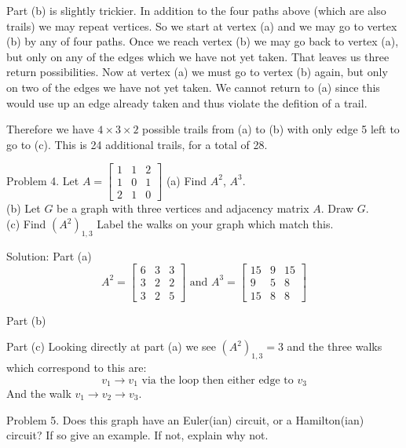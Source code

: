 \documentclass[16 pt]{amsart}
\theoremstyle{definition}
\theoremstyle{remark}
\numberwithin{equation}{subsection}
\begin{document}
Part (b) is slightly trickier.  In addition to the four paths above (which are also trails) we may repeat vertices. So we start at vertex (a) and we may go to vertex (b) by any of four paths.  Once we reach vertex (b) we may go back to vertex (a), but only on any of the edges which we have not yet taken.  That leaves us three return possibilities.  Now at vertex (a) we must go to vertex (b) again, but only on two of the edges we have not yet taken.  We cannot return to (a) since this would use up an edge already taken and thus violate the defition of a trail.

Therefore we have $4\times 3 \times 2$ possible trails from (a) to (b) with only edge 5 left to go to (c).  This is 24 additional trails, for a total of 28.



\newpage

Problem 4.  Let $ A= \begin{bmatrix}
1 & 1 & 2 \\ 1 & 0 & 1 \\ 2 & 1 & 0
\end{bmatrix}$ 
(a) Find $A^2$, $A^3$.\\

(b) Let $G$ be a graph with three vertices and adjacency matrix $A$.  Draw $G$.\\

(c) Find $(A^2)_{1,3}$ Label the walks on your graph which match this.

\vspace{1in}

Solution: Part (a)
\[
A^2 = 
\begin{bmatrix}
6 & 3 & 3 \\
3& 2 & 2\\
3 & 2 & 5
\end{bmatrix} \text{ and } A^3 = \begin{bmatrix}
15 & 9 & 15\\
9& 5 & 8\\
15& 8 & 8
\end{bmatrix}
\]

Part (b)

Part (c) Looking directly at part (a) we see $(A^2)_{1,3} = 3$ and the three walks which correspond to this are:
\[
v_1\rightarrow v_1 \text{ via the loop then either edge to } v_3
\]
And the walk $v_1\rightarrow v_2 \rightarrow v_3$.

\newpage

Problem 5. Does this graph have an Euler(ian) circuit, or a Hamilton(ian) circuit? If so give an example.  If not, explain why not.
\end{document}
